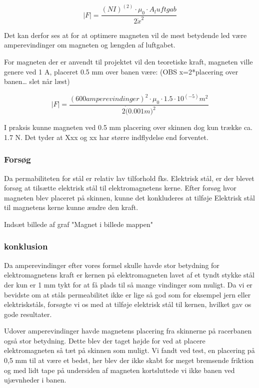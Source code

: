 \begin{equation}
\mid F \mid = \frac{(NI)^(2) \cdot \mu_0 \cdot A_luftgab } {2 \dot x^2}
\end{equation}

Det kan derfor ses at for at optimere magneten vil de mest betydende led være amperevindinger om magneten og længden af luftgabet.

For magneten der er anvendt til projektet vil den teoretiske kraft, magneten ville genere ved 1 A, placeret 0.5 mm over banen være: (OBS x=2*placering over banen… slet når læst)

\begin{equation}
\mid F \mid = \frac{(600 amperevindinger)^2 \cdot \mu_0 \cdot 1.5 \cdot 10^(-5) m^2 } {2 \dot (0.001m)^2}
\end{equation}

I praksis kunne magneten ved 0.5 mm placering over skinnen dog kun trække ca. 1.7 N. Det tyder at Xxx og xx har større indflydelse end forventet.

\subsubsection{Forsøg}
Da permabiliteten for stål er relativ lav tilforhold fks. Elektrisk stål, er der blevet forsøg at tilsætte elektrisk stål til elektromagnetens kerne. Efter forsøg hvor magneten blev placeret på skinnen, kunne det konkluderes at tilføje Elektrisk stål til magnetens kerne kunne ændre den kraft.

Indsæt billede af graf "Magnet i billede mappen"

\subsubsection{konklusion}
Da amperevindinger efter vores formel skulle havde stor betydning for elektromagnetens kraft er kernen på elektromagneten lavet af et tyndt stykke stål der kun er 1 mm tykt for at få plads til så mange vindinger som muligt.  Da vi er bevidste om at ståls permeabilitet ikke er lige så god som for eksempel jern eller elektriskståls, forsøgte vi os med at tilføje elektrisk stål til kernen, hvilket gav os gode resultater.

Udover amperevindinger havde magnetens placering fra skinnerne på racerbanen også stor betydning. Dette blev der taget højde for ved at placere elektromagneten så tæt på skinnen som muligt. Vi fandt ved test, en placering på 0,5 mm til at være et bedst, her blev der ikke skabt for meget bremsende friktion og med lidt tape på undersiden af magneten kortsluttede vi ikke banen ved ujævnheder i banen.
